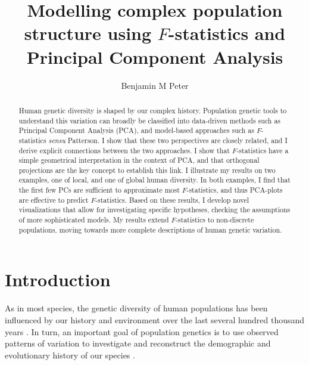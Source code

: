 \documentclass[12pt,fullpage, a4paper]{article}
\title{Modelling complex population structure using $F$-statistics and Principal Component Analysis}
\author{Benjamin M Peter}
\begin{document}
	\maketitle
\begin{abstract}
Human  genetic diversity is shaped by our complex history. Population genetic tools to understand this variation can broadly be classified into data-driven methods such as Principal Component Analysis (PCA), and model-based approaches such as $F$-statistics \textit{sensu} Patterson. I show that these two perspectives are closely related, and I derive explicit connections between the two approaches. I show that $F$-statistics have a simple geometrical interpretation in the context of PCA, and that orthogonal projections are the key concept to establish this link. I illustrate my results on two examples, one of local, and one of global human diversity. In both examples, I find that the first few PCs are sufficient to approximate most $F$-statistics, and thus PCA-plots are effective to predict $F$-statistics. Based on these results, I develop novel visualizations that allow for investigating specific hypotheses, checking the assumptions of more sophisticated models. My results extend $F$-statistics to non-discrete populations, moving towards more complete descriptions of human genetic variation. 
\end{abstract}
\section{Introduction}
As in most species, the genetic diversity of human populations has been influenced by our history and environment over the last several hundred thousand years \citep[e.g][]{cavalli-sforza1994,marciniak2017, reich2018a, nielsen2017, witt2022}. In turn, an important goal of population genetics is to use observed patterns of variation to  investigate and reconstruct the demographic and evolutionary history of our species \citep{schraiber2015, orlando2021}. 
\end{document}
